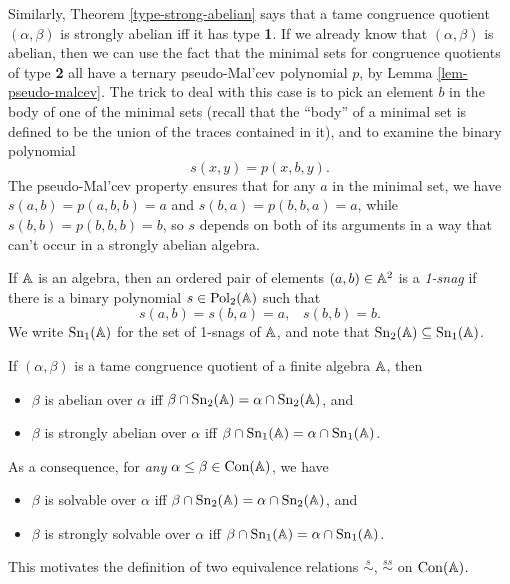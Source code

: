 \begin{appendices}
Similarly, Theorem \ref{type-strong-abelian} says that a tame congruence quotient $(\alpha,\beta)$ is strongly abelian iff it has type \textbf{1}. If we already know that $(\alpha,\beta)$ is abelian, then we can use the fact that the minimal sets for congruence quotients of type \textbf{2} all have a ternary pseudo-Mal'cev polynomial $p$, by Lemma \ref{lem-pseudo-malcev}. The trick to deal with this case is to pick an element $b$ in the body of one of the minimal sets (recall that the ``body'' of a minimal set is defined to be the union of the traces contained in it), and to examine the binary polynomial
\[
s(x,y) = p(x,b,y).
\]
The pseudo-Mal'cev property ensures that for any $a$ in the minimal set, we have $s(a,b) = p(a,b,b) = a$ and $s(b,a) = p(b,b,a) = a$, while $s(b,b) = p(b,b,b) = b$, so $s$ depends on both of its arguments in a way that can't occur in a strongly abelian algebra.

\begin{defn} If $\mathbb{A}$ is an algebra, then an ordered pair of elements $(a,b) \in \mathbb{A}^2$ is a \emph{1-snag} if there is a binary polynomial $s \in \operatorname{Pol}_2(\mathbb{A})$ such that
\[
s(a,b) = s(b,a) = a, \;\;\; s(b,b) = b.
\]
We write $\operatorname{Sn}_1(\mathbb{A})$ for the set of 1-snags of $\mathbb{A}$, and note that $\operatorname{Sn}_2(\mathbb{A}) \subseteq \operatorname{Sn}_1(\mathbb{A})$.
\end{defn}

\begin{thm} If $(\alpha,\beta)$ is a tame congruence quotient of a finite algebra $\mathbb{A}$, then
\begin{itemize}
\item $\beta$ is abelian over $\alpha$ iff $\beta \cap \operatorname{Sn}_2(\mathbb{A}) = \alpha \cap \operatorname{Sn}_2(\mathbb{A})$, and
\item $\beta$ is strongly abelian over $\alpha$ iff $\beta \cap \operatorname{Sn}_1(\mathbb{A}) = \alpha \cap \operatorname{Sn}_1(\mathbb{A})$.
\end{itemize}
As a consequence, for \emph{any} $\alpha \le \beta \in \operatorname{Con}(\mathbb{A})$, we have
\begin{itemize}
\item $\beta$ is solvable over $\alpha$ iff $\beta \cap \operatorname{Sn}_2(\mathbb{A}) = \alpha \cap \operatorname{Sn}_2(\mathbb{A})$, and
\item $\beta$ is strongly solvable over $\alpha$ iff $\beta \cap \operatorname{Sn}_1(\mathbb{A}) = \alpha \cap \operatorname{Sn}_1(\mathbb{A})$.
\end{itemize}
\end{thm}

This motivates the definition of two equivalence relations $\stackrel{s}{\sim}$, $\stackrel{ss}{\sim}$ on $\operatorname{Con}(\mathbb{A})$.


\end{appendices}
